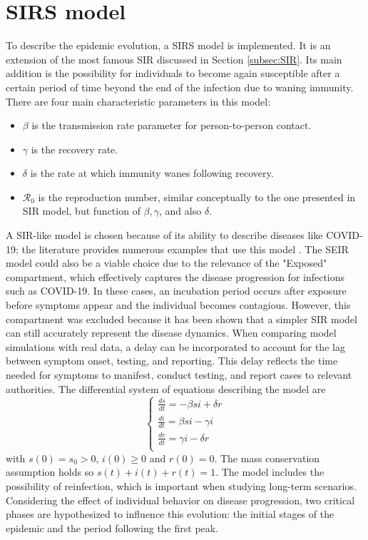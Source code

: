 \section{SIRS model}
\label{sec:SIRS}
To describe the epidemic evolution, a  SIRS model is implemented. It is an extension of the most famous SIR discussed in Section \ref{subsec:SIR}. Its main addition is the possibility for individuals to become again susceptible after a certain period of time beyond the end of the infection due to waning immunity. There are four main characteristic parameters in this model:
\begin{itemize}
	\item $\beta$ is the transmission rate parameter for person-to-person
	contact.
	\item $\gamma$ is the recovery rate.
	\item  $\delta$ is the rate at which immunity wanes following recovery.
	\item  $\mathcal{R}_0$ is the reproduction number, similar conceptually to the one presented in SIR model, but function of $\beta, \gamma$, and also $\delta$. 
\end{itemize}
A SIR-like model is chosen because of its ability to describe diseases like COVID-19; the literature provides numerous examples that use this model \cite{Dehning_2020, Li2022}. The SEIR model could also be a viable choice due to the relevance of the "Exposed" compartment, which effectively captures the disease progression for infections such as COVID-19. In these cases, an incubation period occurs after exposure before symptoms appear and the individual becomes contagious. However, this compartment was excluded because it has been shown \cite{Dehning_2020} that a simpler SIR model can still accurately represent the disease dynamics. When comparing model simulations with real data, a delay can be incorporated to account for the lag between symptom onset, testing, and reporting. This delay reflects the time needed for symptoms to manifest, conduct testing, and report cases to relevant authorities.
The differential system of equations describing the model are
\begin{equation}
	\label{eq:SIRS_eq}
	\begin{cases}
		\frac{ds}{dt} = -\beta s i + \delta r \\
		\frac{di}{dt} = \beta s i -  \gamma i \\
		\frac{dr}{dt}= \gamma i -  \delta r\\
	\end{cases}
\end{equation}
with $s(0) = s_0 > 0$, $i(0) \ge 0$ and $r(0) = 0$. The mass conservation assumption holds so $s(t)+i(t)+r(t) =1$.
The model includes the possibility of reinfection, which is important when studying long-term scenarios. Considering the effect of individual behavior on disease progression, two critical phases are hypothesized to influence this evolution: the initial stages of the epidemic and the period following the first peak.


